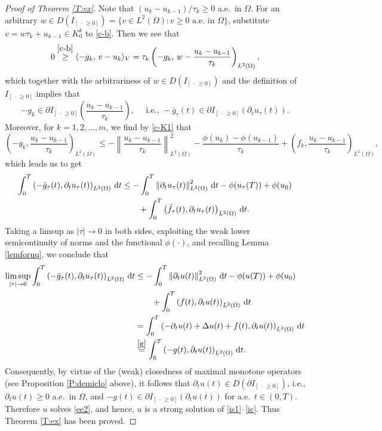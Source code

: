 \documentclass[reqno,10pt]{amsart}
\begin{document}
\begin{proof}[Proof of Theorem \ref{T:ex}]
Note that $(u_k - u_{k-1})/\tau_k \geq 0$ a.e.~in $\Omega$.
For an arbitrary $w \in D({I_{[~\cdot\, \geq 0]}}) = \{v \in L^2(\Omega) \colon v \geq 0
\mbox{ a.e.~in } \Omega\}$, substitute $v = w\tau_k + u_{k-1} \in K_0^k$ to
\eqref{c-b}. Then we see that
$$
0 \stackrel{\eqref{c-b}}{\geq} \langle - g_k, \, v - u_k \rangle_V
= \tau_k \left( -g_k, \, w - \dfrac{u_k - u_{k-1}}{\tau_k}
\right)_{L^2(\Omega)},
$$
which together with the arbitrariness of $w \in D({I_{[~\cdot\, \geq 0]}})$ and the
definition of ${I_{[~\cdot\, \geq 0]}}$ implies that
$$
- g_k \in \partial {I_{[~\cdot\, \geq 0]}} \left( \dfrac{u_k - u_{k-1}}{\tau_k} \right),
\quad \mbox{ i.e., }
- \bar g_\tau(t) \in \partial {I_{[~\cdot\, \geq 0]}} \left( \partial_t u_\tau(t) \right).
$$
Moreover, for $k = 1,2,\ldots,m$, we find by \eqref{c-K1} that 
$$
\left( -g_k, \dfrac{u_k - u_{k-1}}{\tau_k}
\right)_{L^2(\Omega)} 
\leq - \left\| \dfrac{u_k - u_{k-1}}{\tau_k} \right\|_{L^2(\Omega)}^2
- \dfrac{\phi(u_k) - \phi(u_{k-1})}{\tau_k}
+ \left( f_k, \dfrac{u_k - u_{k-1}}{\tau_k} \right)_{L^2(\Omega)},
$$
which leads us to get
\begin{align*}
\int^T_0 \left( -\bar g_\tau(t), \partial_t u_\tau(t)
\right)_{L^2(\Omega)} \, {\text{\rm d}} t
&\leq - \int^T_0 \left\| \partial_t u_\tau(t)
 \right\|_{L^2(\Omega)}^2 \,{\text{\rm d}} t
- \phi(u_\tau(T)) + \phi(u_0)\\
 & \qquad + \int^T_0 \left( \bar f_\tau(t), \partial_t u_\tau(t)
 \right)_{L^2(\Omega)}  \, {\text{\rm d}} t. 
\end{align*}
Taking a limsup as $|\tau| \to 0$ in both sides, exploiting the weak
lower semicontinuity of norms and the functional $\phi(\cdot)$, and
recalling Lemma \ref{lemforuq}, we conclude that
\begin{align}
\limsup_{|\tau| \to 0}
\int^T_0 \left( -\bar g_\tau(t), \partial_t u_\tau(t)
\right)_{L^2(\Omega)} \, {\text{\rm d}} t
&\leq - \int^T_0 \left\| \partial_t u (t) \right\|_{L^2(\Omega)}^2
 \,{\text{\rm d}} t - \phi(u(T)) + \phi(u_0)\nonumber\\
 & \qquad + \int^T_0 \left( f(t), \partial_t u(t) \right)_{L^2(\Omega)}
 \, {\text{\rm d}} t\nonumber\\
&=
\int^T_0 \left( - \partial_t u(t) + \Delta u(t) + f(t),
 \partial_t u(t) \right)_{L^2(\Omega)} \, {\text{\rm d}} t \nonumber\\
&\stackrel{\eqref{g}}=  \int^T_0 \left( - g(t), \partial_t u(t) \right)_{L^2(\Omega)} \, {\text{\rm d}} t.\label{limsup}
\end{align}
Consequently, by virtue of the (weak) closedness of maximal monotone
operators (see Proposition \ref{P:demiclo} above), it follows that
$\partial_t u(t) \in D(\partial {I_{[~\cdot\, \geq 0]}})$, i.e., $\partial_t u(t) \geq 0$ a.e.~in $\Omega$, and $- g(t) \in \partial {I_{[~\cdot\, \geq 0]}}(\partial_t u(t))$ for a.e.~$t \in
(0,T)$. Therefore $u$ solves \eqref{ee2}, and hence, $u$ is a strong
solution of \eqref{is1}--\eqref{ic}. Thus Theorem \ref{T:ex} has been
proved.
\end{proof}
\end{document}
